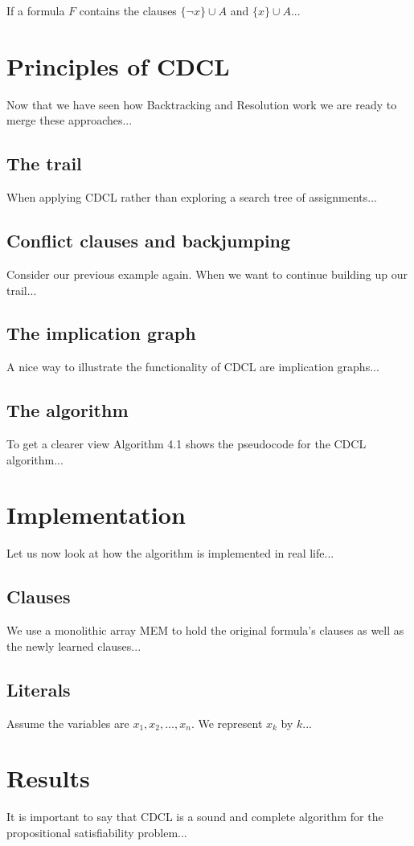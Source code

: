 If a formula \(F\) contains the clauses \(\{\neg x\} \cup A\) and \(\{x\} \cup A\)...

\section{Principles of CDCL}

Now that we have seen how Backtracking and Resolution work we are ready to merge these approaches...

\subsection{The trail}

When applying CDCL rather than exploring a search tree of assignments...

\subsection{Conflict clauses and backjumping}

Consider our previous example again. When we want to continue building up our trail...

\subsection{The implication graph}

A nice way to illustrate the functionality of CDCL are implication graphs...

\subsection{The algorithm}

To get a clearer view Algorithm 4.1 shows the pseudocode for the CDCL algorithm...

\section{Implementation}

Let us now look at how the algorithm is implemented in real life...

\subsection{Clauses}

We use a monolithic array MEM to hold the original formula’s clauses as well as the newly learned clauses...

\subsection{Literals}

Assume the variables are \(x_1, x_2, \ldots, x_n\). We represent \(x_k\) by \(k\)...

\section{Results}

It is important to say that CDCL is a sound and complete algorithm for the propositional satisfiability problem...
